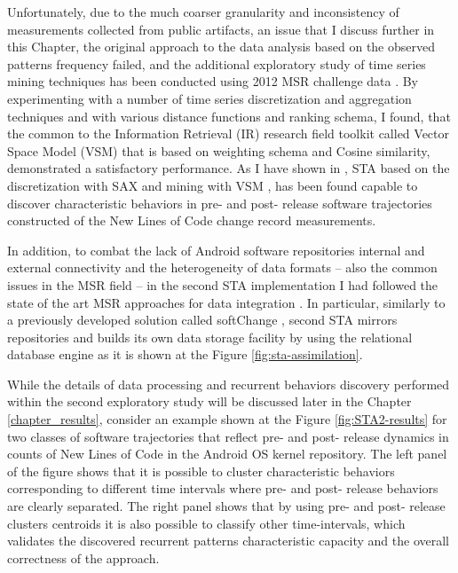Unfortunately, due to the much coarser granularity and inconsistency of measurements collected from public artifacts, 
an issue that I discuss further in this Chapter, the original approach to the data analysis based on the observed patterns 
frequency failed, and the additional exploratory study of time series mining techniques has been conducted using 
2012 MSR challenge data \cite{MSRChallenge2012}.
By experimenting with a number of time series discretization and aggregation techniques and with various distance 
functions and ranking schema, I found, that the common to the Information Retrieval (IR) research field toolkit called 
Vector Space Model (VSM) \cite{citeulike:300428} that is based on \tfidf weighting schema and Cosine similarity, 
demonstrated a satisfactory performance. 
As I have shown in \cite{csdl2-11-10}, STA based on the discretization with SAX \cite{sax} and mining with VSM 
\cite{citeulike:300428}, has been found capable to discover characteristic behaviors in pre- and post- release software 
trajectories constructed of the New Lines of Code change record measurements.

In addition, to combat the lack of Android software repositories internal and external connectivity and the heterogeneity 
of data formats -- also the common issues in the MSR field -- in the second STA implementation I had followed the state of 
the art MSR approaches for data integration \cite{citeulike:13058334} \cite{cvsanaly}. 
In particular, similarly to a previously developed solution called softChange \cite{german04_softchange}, second STA mirrors 
repositories and builds its own data storage facility by using the relational database engine as it is shown at 
the Figure \ref{fig:sta-assimilation}.

While the details of data processing and recurrent behaviors discovery performed within the second exploratory study will be 
discussed later in the Chapter \ref{chapter_results}, consider an example shown at the Figure \ref{fig:STA2-results} 
for two classes of software trajectories that reflect pre- and post- release dynamics in counts of New Lines of Code in 
the Android OS kernel repository. 
The left panel of the figure shows that it is possible to cluster characteristic behaviors corresponding to different time intervals 
where pre- and post- release behaviors are clearly separated. 
The right panel shows that by using pre- and post- release clusters centroids it is also possible to classify other time-intervals, 
which validates the discovered recurrent patterns characteristic capacity and the overall correctness of the approach.

